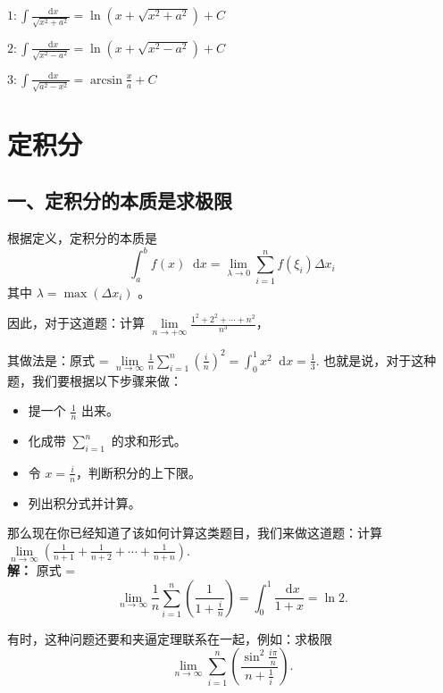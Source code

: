 \documentclass[b5paper]{ctexart}
\renewcommand{\d}{\mathop{}\!\mathrm{d}}
\begin{document}
	$1: \int \frac{\d x}{\sqrt{x^2 + a^2}} = \ln (x + \sqrt{x^2 + a^2}) + C$
	
	$2: \int \frac{\d x}{\sqrt{x^2 - a^2}} = \ln (x + \sqrt{x^2 - a^2}) + C$
	
	$3: \int \frac{\d x}{\sqrt{a^2 - x^2}} = \arcsin \frac{x}{a} + C$
	
	\newpage
	\section{定积分}
	
	\subsection*{一、定积分的本质是求极限}
	
	根据定义，定积分的本质是
	\begin{equation*}
		\int_{a}^{b} f(x) \d x = \lim\limits_{\lambda \to 0} \sum_{i = 1}^{n} f(\xi_i) \Delta x_i
	\end{equation*}
	其中 $\lambda = \max(\Delta x_i)$ 。
	
	因此，对于这道题：计算 $\lim\limits_{n \to +\infty} \frac{1^2 +2^2 + \cdots + n^2}{n ^ 3}$，
	
	其做法是：原式 = $\lim\limits_{n \to \infty} \frac{1}{n} \sum \limits_{i = 1}^{n} (\frac{i}{n})^2 = \int_{0}^{1} x^2 \d x = \frac{1}{3}$.
	也就是说，对于这种题，我们要根据以下步骤来做：
	\begin{itemize}
		\item 提一个 $\frac{1}{n}$ 出来。
		\item 化成带 $\sum \limits_{i = 1}^{n}$ 的求和形式。
		\item 令 $x = \frac{i}{n}$，判断积分的上下限。
		\item 列出积分式并计算。
	\end{itemize}
	
	那么现在你已经知道了该如何计算这类题目，我们来做这道题：计算 $\lim\limits_{n \to \infty} (\frac{1}{n + 1} + \frac{1}{n + 2} + \cdots + \frac{1}{n + n})$.\\
	
	\textbf{解：} 原式 = 
	\begin{equation*}
		\lim\limits_{n \to \infty} \frac{1}{n} \sum \limits_{i = 1} ^n(\frac{1}{1 + \frac{i}{n}}) = \int_{0}^{1} \frac{\d x}{1 + x}  = \ln 2.
	\end{equation*}
	
	有时，这种问题还要和夹逼定理联系在一起，例如：求极限
	\begin{equation*}
		\lim\limits_{n \to \infty} \sum_{i = 1}^{n} (\frac{\sin ^2 \frac{i \pi}{n}}{n + \frac{1}{i}}).
	\end{equation*}
   
\end{document}

